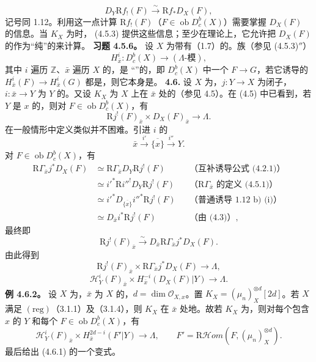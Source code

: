 \[D_Y\mathrm Rf_!(F)\xrightarrow\sim\mathrm Rf_*D_X(F),\]
记号同 1.12。利用这一点计算 $\mathrm Rf_!(F)$（$F\in\operatorname{ob}D_c^b(X)$）需要掌握 $D_X(F)$ 的信息。当 $K_X$ 为时， (4.5.3) 提供这些信息；至少在理论上，它允许把 $D_X(F)$ 的作为“纯”的来计算。
\textbf{习题 4.5.6。} 设 $X$ 为带有（1.7）的。族（参见 (4.5.3)$''$）
\[H_{\bar x}^i:D_c^b(X)\longrightarrow(\Lambda\text{-模}),\]
其中 $i$ 遍历 $\mathbb Z$、$\bar x$ 遍历 $X$ 的，是
“”的，即 $D_c^b(X)$ 中一个 $F\to G$，若它诱导的 $H_{\bar x}^i(F)\to H_{\bar x}^i(G)$ 都是，则它本身是。
\textbf{4.6.} 设 $X$ 为，$j:Y\to X$ 为闭子，$i:\bar x\to Y$ 为 $Y$ 的。又设 $K_X$ 为 $X$ 上在 $\bar x$ 处的（参见 4.5）。在 (4.5) 中已看到，若 $Y$ 是 $x$ 的，则对 $F\in\operatorname{ob}D_c^b(X)$，有
\[\mathrm Rj^!(F)_{\bar x}\times D_X(F)_{\bar x}\longrightarrow\Lambda.\]
在一般情形中定义类似并不困难。引进 $i$ 的
\[\bar x\xrightarrow{i'}\overline{\{x\}}\xrightarrow{i''}Y.\]
对 $F\in\operatorname{ob}D_c^b(X)$，有
\[
\begin{aligned}
\mathrm R\Gamma_{\bar x}j^*D_X(F)
&\simeq\mathrm R\Gamma_{\bar x}D_Y\mathrm Rj^!(F)
&&\text{（互补诱导公式 (4.2.1)）}\\
&\simeq i'^*\mathrm Ri''^!D_Y\mathrm Rj^!(F)
&&\text{（$\mathrm R\Gamma_{\bar x}$ 的定义 (4.5.1)）}\\
&\simeq i'^*D_{\overline{\{x\}}}i''^*\mathrm Rj^!(F)
&&\text{（普通诱导 1.12 b) (i)）}\\
&\simeq D_{\bar x}i^*\mathrm Rj^!(F)&&\text{（由 (4.3)）},
\end{aligned}
\]
最终即
\[
\mathrm Rj^!(F)_{\bar x}\xrightarrow\sim D_{\bar x}\mathrm R\Gamma_{\bar x}j^*D_X(F).\tag{4.6.1}
\]
由此得到
\[
\mathrm Rj^!(F)_{\bar x}\times\mathrm R\Gamma_{\bar x}j^*D_X(F)\longrightarrow\Lambda,\tag{4.6.1$'$}
\]
\[
\mathscr H_Y^i(F)_{\bar x}\times H_{\bar x}^{-i}(D_X(F)|Y)\longrightarrow\Lambda.\tag{4.6.1$''$}
\]
\textbf{例 4.6.2。} 设 $X$ 为，$\bar x$ 为 $X$ 的，$d=\dim\mathscr O_{X,x}$。置 $K_X=(\mu_n)_X^{\otimes d}[2d]$。若 $X$ 满足 $(\mathrm{reg})$（3.1.1）及（3.1.4），则 $K_X$ 在 $\bar x$ 处地。故若 $K_X$ 为，则对每个包含 $x$ 的 $Y$ 和每个 $F\in\operatorname{ob}D_c^b(X)$，有
\[
\mathscr H_Y^i(F)_{\bar x}\times H_{\bar x}^{2d-i}(F'|Y)\longrightarrow\Lambda,
\qquad F'=\mathrm R\mathscr Hom(F,(\mu_n)_X^{\otimes d}).
\]
最后给出 (4.6.1) 的一个变式。

